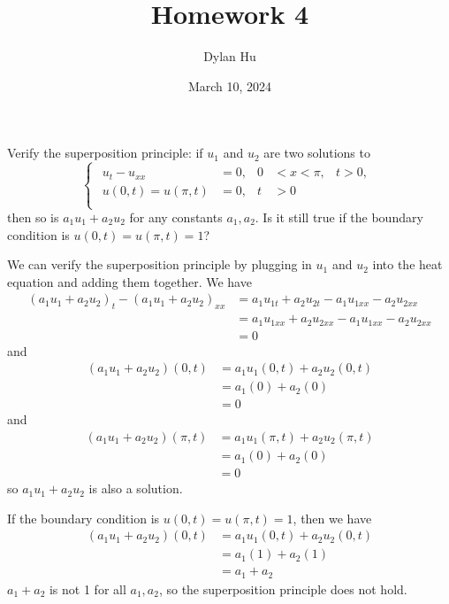 \documentclass[plain]{pset}
\title{Homework 4}
\author{Dylan Hu}
\date{March 10, 2024}
\begin{document}
\maketitle

\pagebreak

\begin{problem}
Verify the superposition principle: if \(u_1\) and \(u_2\) are two solutions to
\[
    \begin{cases}
        \begin{aligned}
            u_t - u_{xx}        & = 0, & 0 & < x < \pi, & t > 0, \\
            u(0, t) = u(\pi, t) & = 0, & t & > 0                 \\
        \end{aligned}
    \end{cases}
\]
then so is \(a_1u_1 + a_2u_2\) for any constants \(a_1, a_2\). Is it still true if the boundary condition is \(u(0, t) = u(\pi, t) = 1\)?
\end{problem}
\begin{solution}
    We can verify the superposition principle by plugging in \(u_1\) and \(u_2\) into the heat equation and adding them together. We have
    \[
        \begin{aligned}
            (a_1u_1 + a_2u_2)_t - (a_1u_1 + a_2u_2)_{xx} & = a_1u_{1t} + a_2u_{2t} - a_1u_{1xx} - a_2u_{2xx}   \\
                                                         & = a_1u_{1xx} + a_2u_{2xx} - a_1u_{1xx} - a_2u_{2xx} \\
                                                         & = 0
        \end{aligned}
    \]
    and
    \[
        \begin{aligned}
            (a_1u_1 + a_2u_2)(0, t) & = a_1u_1(0, t) + a_2u_2(0, t) \\
                                    & = a_1(0) + a_2(0)             \\
                                    & = 0
        \end{aligned}
    \]
    and
    \[
        \begin{aligned}
            (a_1u_1 + a_2u_2)(\pi, t) & = a_1u_1(\pi, t) + a_2u_2(\pi, t) \\
                                      & = a_1(0) + a_2(0)                 \\
                                      & = 0
        \end{aligned}
    \]
    so \(a_1u_1 + a_2u_2\) is also a solution.

    If the boundary condition is \(u(0, t) = u(\pi, t) = 1\), then we have
    \[
        \begin{aligned}
            (a_1u_1 + a_2u_2)(0, t) & = a_1u_1(0, t) + a_2u_2(0, t) \\
                                    & = a_1(1) + a_2(1)             \\
                                    & = a_1 + a_2
        \end{aligned}
    \]
    \(a_1 + a_2\) is not 1 for all \(a_1, a_2\), so the superposition principle does not hold.
\end{solution}
\end{document}
